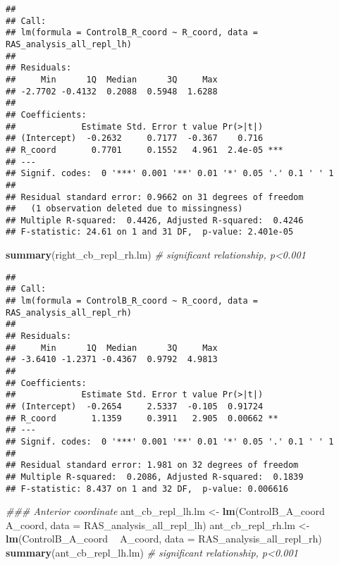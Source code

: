 \documentclass[
]{article}
\newenvironment{Shaded}{\begin{snugshade}}{\end{snugshade}}
\newcommand{\CommentTok}[1]{\textcolor[rgb]{0.56,0.35,0.01}{\textit{#1}}}
\newcommand{\DataTypeTok}[1]{\textcolor[rgb]{0.13,0.29,0.53}{#1}}
\newcommand{\KeywordTok}[1]{\textcolor[rgb]{0.13,0.29,0.53}{\textbf{#1}}}
\newcommand{\NormalTok}[1]{#1}
\newcommand{\OperatorTok}[1]{\textcolor[rgb]{0.81,0.36,0.00}{\textbf{#1}}}
\newcommand{\StringTok}[1]{\textcolor[rgb]{0.31,0.60,0.02}{#1}}
\begin{document}
\begin{verbatim}
## 
## Call:
## lm(formula = ControlB_R_coord ~ R_coord, data = RAS_analysis_all_repl_lh)
## 
## Residuals:
##     Min      1Q  Median      3Q     Max 
## -2.7702 -0.4132  0.2088  0.5948  1.6288 
## 
## Coefficients:
##             Estimate Std. Error t value Pr(>|t|)    
## (Intercept)  -0.2632     0.7177  -0.367    0.716    
## R_coord       0.7701     0.1552   4.961  2.4e-05 ***
## ---
## Signif. codes:  0 '***' 0.001 '**' 0.01 '*' 0.05 '.' 0.1 ' ' 1
## 
## Residual standard error: 0.9662 on 31 degrees of freedom
##   (1 observation deleted due to missingness)
## Multiple R-squared:  0.4426, Adjusted R-squared:  0.4246 
## F-statistic: 24.61 on 1 and 31 DF,  p-value: 2.401e-05
\end{verbatim}

\begin{Shaded}
\begin{Highlighting}[]
\KeywordTok{summary}\NormalTok{(right_cb_repl_rh.lm) }\CommentTok{# significant relationship, p<0.001}
\end{Highlighting}
\end{Shaded}

\begin{verbatim}
## 
## Call:
## lm(formula = ControlB_R_coord ~ R_coord, data = RAS_analysis_all_repl_rh)
## 
## Residuals:
##     Min      1Q  Median      3Q     Max 
## -3.6410 -1.2371 -0.4367  0.9792  4.9813 
## 
## Coefficients:
##             Estimate Std. Error t value Pr(>|t|)   
## (Intercept)  -0.2654     2.5337  -0.105  0.91724   
## R_coord       1.1359     0.3911   2.905  0.00662 **
## ---
## Signif. codes:  0 '***' 0.001 '**' 0.01 '*' 0.05 '.' 0.1 ' ' 1
## 
## Residual standard error: 1.981 on 32 degrees of freedom
## Multiple R-squared:  0.2086, Adjusted R-squared:  0.1839 
## F-statistic: 8.437 on 1 and 32 DF,  p-value: 0.006616
\end{verbatim}

\begin{Shaded}
\begin{Highlighting}[]
\CommentTok{### Anterior coordinate}
\NormalTok{ant_cb_repl_lh.lm <-}\StringTok{ }\KeywordTok{lm}\NormalTok{(ControlB_A_coord }\OperatorTok{~}\StringTok{ }\NormalTok{A_coord, }\DataTypeTok{data =}\NormalTok{ RAS_analysis_all_repl_lh)}
\NormalTok{ant_cb_repl_rh.lm <-}\StringTok{ }\KeywordTok{lm}\NormalTok{(ControlB_A_coord }\OperatorTok{~}\StringTok{ }\NormalTok{A_coord, }\DataTypeTok{data =}\NormalTok{ RAS_analysis_all_repl_rh)}
\KeywordTok{summary}\NormalTok{(ant_cb_repl_lh.lm) }\CommentTok{# significant relationship, p<0.001}
\end{Highlighting}
\end{Shaded}
\end{document}
